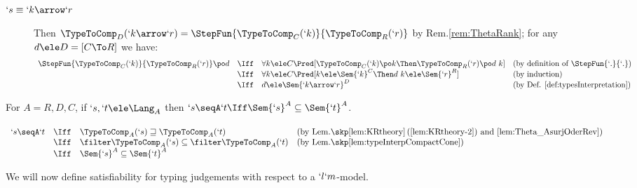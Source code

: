 \documentclass{CSML}
\begin{document}
\begin{description}
\[\begin{array}{lcll}
 \end{array} \] 
	
 \item [$ `s \equiv `k\arrow `r $] 
Then $\TypeToComp_D(`k\arrow `r) = \StepFun{\TypeToComp_C(`k)}{\TypeToComp_R(`r)}$ by Rem.\skp\ref{rem:ThetaRank}; for any $d \ele D = [C\To R]$ we have: 
%
 \[ \begin{array}{lcll}
\StepFun{\TypeToComp_C(`k)}{\TypeToComp_R(`r)} \po d 
	& \Iff &
\forall k \ele C \Pred[ \TypeToComp_C(`k) \po k \Then \TypeToComp_R(`r) \po d \ k ]
		& (\textrm{by definition of } \StepFun{`.}{`.} ) \\ %
	& \Iff & 
\forall k \ele C \Pred[ k \ele \Sem{`k}^C \Then d \ k \ele \Sem{`r}^R ]
		& (\textrm{by induction}) \\
	& \Iff & 
d \ele \Sem{ `k\arrow `r}^D 
	& (\textrm{by Def. \ref{def:typesInterpretation}}) 
 \end{array} \]
\arrayqed[-22pt] %
 \end{description}



 \begin{cor} \label{cor:leq} 
For $A = R,D,C$, if $`s, `t \ele \Lang_A$ then $`s \seqA `t \Iff \Sem{ `s }^A \subseteq \Sem{ `t }^A$.
 \end{cor}

\proof%
 $ \begin{array}[t]{rcl@{\quad}l}
`s \seqA `t 
	& \Iff & 
\TypeToComp_A(`s) \sqsupseteq \TypeToComp_A(`t) 
	& (\textrm{by Lem.\skp\ref{lem:KRtheory}\,(\ref{lem:KRtheory-2}) and 
	\ref{lem:Theta_AsurjOderRev}}) \\ %
	& \Iff & 
\filter \TypeToComp_A(`s) \subseteq \filter \TypeToComp_A(`t) 
	& (\textrm{by Lem.\skp\ref{lem:typeInterpCompactCone}}) \\ %
	& \Iff & 
\Sem{ `s }^A \subseteq \Sem{ `t }^A 
 \end{array} $ 
\arrayqed 

\noindent We will now define satisfiability for typing judgements with respect to a $`l`m$-model.
\end{document}

